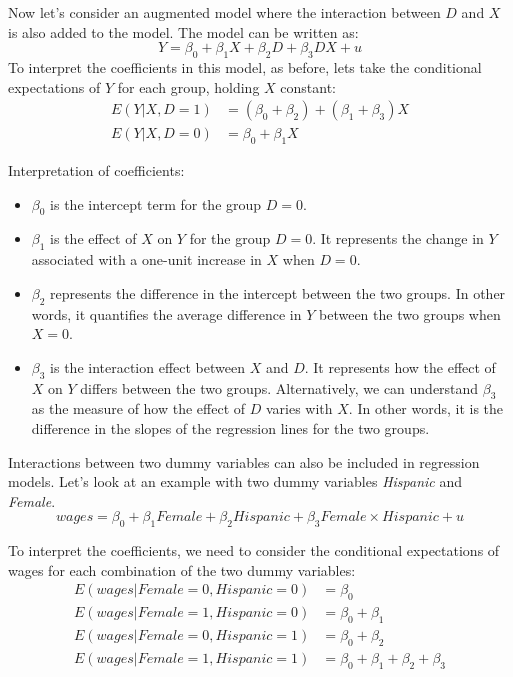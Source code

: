 \documentclass{./../../Latex/handout}
\begin{document}
Now let's consider an augmented model where the interaction between $D$ and $X$ is also added to the model. The model can be written as:
$$ Y = \beta_0 + \beta_1 X + \beta_2 D +  \beta_3 DX + u $$
To interpret the coefficients in this model, as before, lets take the conditional expectations of $Y$ for each group, holding $X$ constant:
\begin{align*}
E(Y | X, D=1) &= (\beta_0 + \beta_2) + (\beta_1+ \beta_3) X  \\
E(Y | X, D=0) &= \beta_0 + \beta_1 X 
\end{align*}

Interpretation of coefficients: 
\begin{itemize}
  \item $\beta_0$ is the intercept term for the group $D=0$.
  \item $\beta_1$ is the effect of $X$ on $Y$ for the group $D=0$. It represents the change in $Y$ associated with a one-unit increase in $X$ when $D=0$.
  \item $\beta_2$ represents the difference in the intercept between the two groups. In other words, it quantifies the average difference in $Y$ between the two groups when $X=0$.
  \item $\beta_3$ is the interaction effect between $X$ and $D$. It represents how the effect of $X$ on $Y$ differs between the two groups. Alternatively, we can understand $\beta_3$ as the measure of how the effect of $D$ varies with $X$.  In other words, it is the difference in the slopes of the regression lines for the two groups.
\end{itemize}

Interactions between two dummy variables can also be included in regression models. Let's look at an example with two dummy variables \textit{Hispanic} and \textit{Female}.  
$$ wages = \beta_0 + \beta_1 Female + \beta_2 Hispanic + \beta_3 Female \times Hispanic +  u  $$ 

To interpret the coefficients, we need to consider the conditional expectations of wages for each combination of the two dummy variables:
\begin{align*}
E(wages | Female=0, Hispanic=0) &= \beta_0 \\
E(wages | Female=1, Hispanic=0) &= \beta_0 + \beta_1 \\
E(wages | Female=0, Hispanic=1) &= \beta_0 + \beta_2 \\
E(wages | Female=1, Hispanic=1) &= \beta_0 + \beta_1 + \beta_2 + \beta_3
\end{align*}
\end{document}
